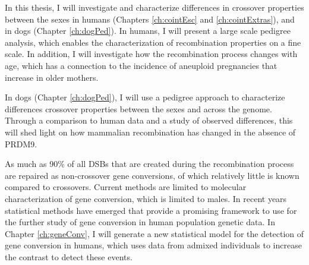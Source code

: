 In this thesis, I will investigate and characterize differences in crossover properties between the sexes in humans (Chapters \ref{ch:cointEsc} and \ref{ch:cointExtras}), and in dogs (Chapter \ref{ch:dogPed}).
In humans, I will present a large scale pedigree analysis, which enables the characterization of recombination properties on a fine scale.
In addition, I will investigate how the recombination process changes with age, which has a connection to the incidence of aneuploid pregnancies that increase in older mothers.

In dogs (Chapter \ref{ch:dogPed}), I will use a pedigree approach to characterize differences crossover properties between the sexes and across the genome.
Through a comparison to human data and a study of observed differences, this will shed light on how mammalian recombination has changed in the absence of PRDM9.

As much as 90\% of all DSBs that are created during the recombination process are repaired as non-crossover gene conversions, of which relatively little is known compared to crossovers.
Current methods are limited to molecular characterization of gene conversion, which is limited to males.
In recent years statistical methods have emerged that provide a promising framework to use for the further study of gene conversion in human population genetic data.
In Chapter \ref{ch:geneConv}, I will generate a new statistical model for the detection of gene conversion in humans, which uses data from admixed individuals to increase the contrast to detect these events.




\clearpage
\renewcommand{\bibname}{References}
\begingroup
    \setlength{\bibsep}{10pt}
    \linespread{1}\selectfont
    
\endgroup

